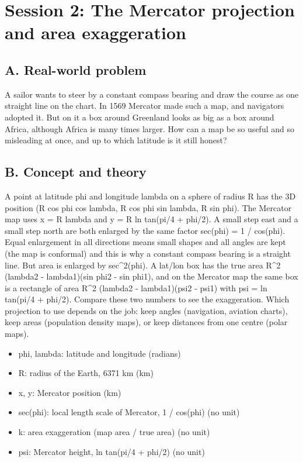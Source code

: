 \documentclass[11pt,a4paper]{article}
\begin{document}
\section{Session 2: The Mercator projection and area exaggeration}

\subsection*{A. Real-world problem}
A sailor wants to steer by a constant compass bearing and draw the course as one straight line on the chart. In 1569 Mercator made such a map, and navigators adopted it. But on it a box around Greenland looks as big as a box around Africa, although Africa is many times larger. How can a map be so useful and so misleading at once, and up to which latitude is it still honest?

\subsection*{B. Concept and theory}
A point at latitude phi and longitude lambda on a sphere of radius R has the 3D position (R cos phi cos lambda, R cos phi sin lambda, R sin phi). The Mercator map uses x = R lambda and y = R ln tan(pi/4 + phi/2). A small step east and a small step north are both enlarged by the same factor sec(phi) = 1 / cos(phi). Equal enlargement in all directions means small shapes and all angles are kept (the map is conformal) and this is why a constant compass bearing is a straight line. But area is enlarged by sec\textasciicircum{}2(phi). A lat/lon box has the true area R\textasciicircum{}2 (lambda2 - lambda1)(sin phi2 - sin phi1), and on the Mercator map the same box is a rectangle of area R\textasciicircum{}2 (lambda2 - lambda1)(psi2 - psi1) with psi = ln tan(pi/4 + phi/2). Compare these two numbers to see the exaggeration. Which projection to use depends on the job: keep angles (navigation, aviation charts), keep areas (population density maps), or keep distances from one centre (polar maps).

\begin{itemize}[nosep]
\item phi, lambda: latitude and longitude (radians)
\item R: radius of the Earth, 6371 km (km)
\item x, y: Mercator position (km)
\item sec(phi): local length scale of Mercator, 1 / cos(phi) (no unit)
\item k: area exaggeration (map area / true area) (no unit)
\item psi: Mercator height, ln tan(pi/4 + phi/2) (no unit)
\end{itemize}
\end{document}
